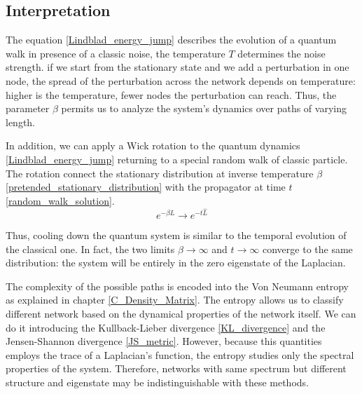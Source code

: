 \subsection{Interpretation}

The equation \eqref{Lindblad_energy_jump} describes the evolution of a quantum walk in presence of a classic noise, the temperature $T$ determines the noise strength.
if we start from the stationary state and we add a perturbation in one node, the spread of the perturbation across the network depends on temperature: higher is the temperature, fewer nodes the perturbation can reach. Thus, the parameter $\beta$ permits us to analyze the system's dynamics over paths of varying length.

In addition, we can apply a Wick rotation to the quantum dynamics \eqref{Lindblad_energy_jump} returning to a special random walk of classic particle. The rotation connect the stationary distribution at inverse temperature $\beta$ \eqref{pretended_stationary_distribution} with the propagator at time $t$ \eqref{random_walk_solution}.
\begin{equation}
    e^{-\beta\hat L} \rightarrow e^{-t\hat L}
\end{equation}

Thus, cooling down the quantum system is similar to the temporal evolution of the classical one. In fact, the two limits $\beta \rightarrow \infty$ and $t \rightarrow \infty$ converge to the same distribution: the system will be entirely in the zero eigenstate of the Laplacian.


The complexity of the possible paths is encoded into the Von Neumann entropy as explained in chapter \ref{C_Density_Matrix}.
The entropy allows us to classify different network based on the dynamical properties of the network itself. 
We can do it introducing the Kullback-Lieber divergence \eqref{KL_divergence} and the Jensen-Shannon divergence \eqref{JS_metric}.
However, because this quantities employs the trace of a Laplacian's function, the entropy studies only the spectral properties of the system. Therefore, networks with same spectrum but different structure and eigenstate may be indistinguishable with these methods.